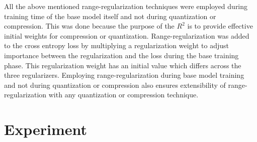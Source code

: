 \documentclass[10pt,twocolumn,letterpaper]{article}
\begin{document}
All the above mentioned range-regularization techniques were employed during training time of the base model itself and not during quantization or compression. This was done because the purpose of the $R^2$ is to provide effective initial weights for compression or quantization. Range-regularization was added to the cross entropy loss by multiplying a regularization weight to adjust importance between the regularization and the loss during the base training phase. This regularization weight has an initial value which differs across the three regularizers. Employing range-regularization during base model training and not during quantization or compression also ensures extensibility of range-regularization with any quantization or compression technique.  \section{Experiment}
\label{experiment}
\end{document}
